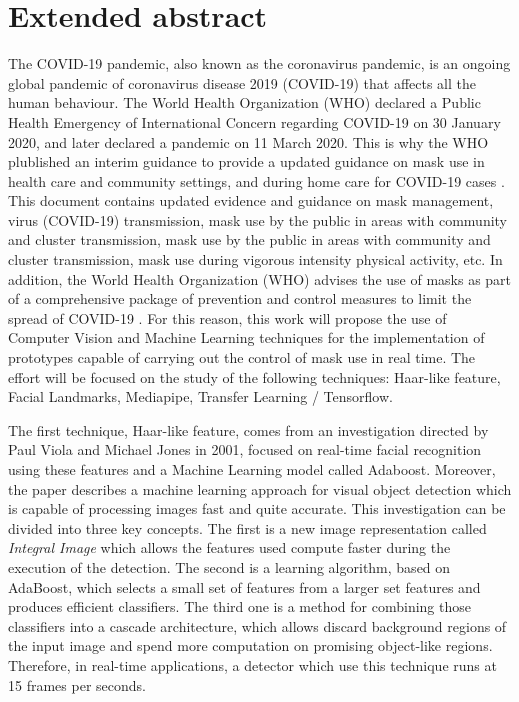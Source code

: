 
\chapter*{Extended abstract}

\vspace{-1cm}
The COVID-19 pandemic, also known as the coronavirus pandemic, is an ongoing global pandemic of coronavirus disease 2019 (COVID-19) that affects all the human behaviour. The World Health Organization (WHO) declared a Public Health Emergency of International Concern regarding COVID-19 on 30 January 2020, and later declared a pandemic on 11 March 2020. This is why the WHO plublished an interim guidance to provide a updated guidance on mask use in health care and community settings, and during home care for COVID-19 cases \cite{covid19}. This document contains updated evidence and guidance on mask management, virus (COVID-19) transmission, mask use by the public in areas with community and cluster transmission, mask use by the public in areas with community and cluster transmission, mask use during vigorous intensity physical activity, etc. In addition, the World Health Organization (WHO) advises the use of masks as part of a comprehensive package of prevention and control measures to limit the spread of COVID-19 \cite{oms}. For this reason, this work will propose the use of Computer Vision and Machine Learning techniques for the implementation of prototypes capable of carrying out the control of mask use in real time. The effort will be focused on the study of the following techniques: Haar-like feature, Facial Landmarks, Mediapipe, Transfer Learning / Tensorflow.

The first technique, Haar-like feature, comes from an investigation directed by Paul Viola and Michael Jones in 2001, focused on real-time facial recognition using these features and a Machine Learning model called Adaboost. Moreover, the paper \cite{paulViola} describes a machine learning approach for visual object detection which is capable of processing images fast and quite accurate. This investigation can be divided into three key concepts. The first is a new image representation called \textit{Integral Image} which allows the features used compute faster during the execution of the detection. The second is a learning algorithm, based on AdaBoost, which selects a small set of features from a larger set features and produces efficient classifiers. The third one is a method for combining those classifiers into a cascade architecture, which allows discard background regions of the input image and spend more computation on promising object-like regions. Therefore, in real-time applications, a detector which use this technique runs at 15 frames per seconds.

